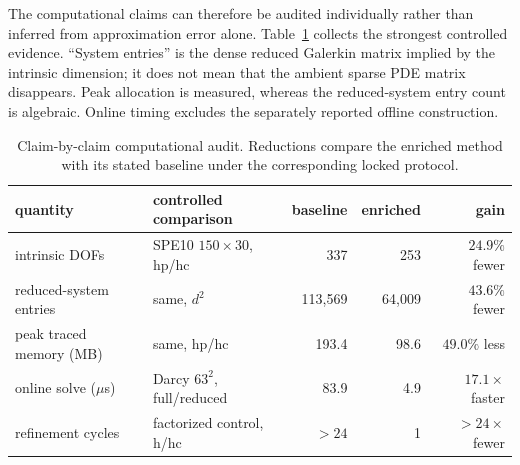 \documentclass[11pt]{article}
\numberwithin{algorithm}{section}
\theoremstyle{definition}\newtheorem{definition}[theorem]{Definition}
\theoremstyle{remark}\newtheorem{remark}[theorem]{Remark}
\begin{document}
The computational claims can therefore be audited individually rather than
inferred from approximation error alone.  Table~\ref{tab:computational-gain-audit}
collects the strongest controlled evidence.  ``System entries'' is the dense
reduced Galerkin matrix implied by the intrinsic dimension; it does not mean
that the ambient sparse PDE matrix disappears.  Peak allocation is measured,
whereas the reduced-system entry count is algebraic.  Online timing excludes
the separately reported offline construction.

\begin{table}[h]
\centering
\caption{Claim-by-claim computational audit.  Reductions compare the enriched
method with its stated baseline under the corresponding locked protocol.}
\label{tab:computational-gain-audit}
\begin{tabular}{p{}p{}rrr}
\toprule
quantity & controlled comparison & baseline & enriched & gain\\
\midrule
intrinsic DOFs & SPE10 $150\times30$, hp/hc & 337 & 253 & $24.9\%$ fewer\\
reduced-system entries & same, $d^2$ & 113,569 & 64,009 & $43.6\%$ fewer\\
peak traced memory (MB) & same, hp/hc & 193.4 & 98.6 & $49.0\%$ less\\
online solve ($\mu$s) & Darcy $63^2$, full/reduced & 83.9 & 4.9 & $17.1\times$ faster\\
refinement cycles & factorized control, h/hc & $>24$ & 1 & $>24\times$ fewer\\
\bottomrule
\end{tabular}
\end{table}
\end{document}
